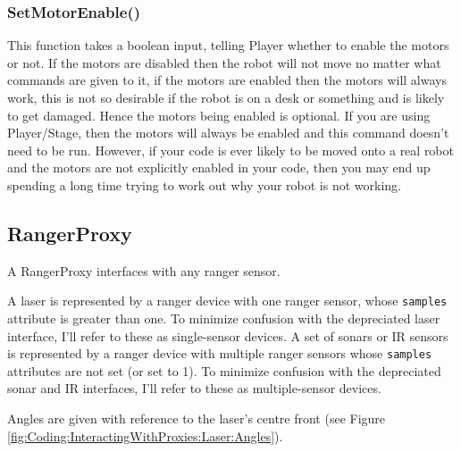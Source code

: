 \documentclass[a4paper]{report}
\newcommand{\plst}{Player/Stage\xspace}
\newcommand{\pl}{Player\xspace}
\begin{document}
\subsubsection{SetMotorEnable()}
This function takes a boolean input, telling \pl whether to enable the
motors or not. If the motors are disabled then the robot will not move no
matter what commands are given to it, if the motors are enabled then the
motors will always work, this is not so desirable if the robot is on a desk
or something and is likely to get damaged. Hence the motors being enabled
is optional. If you are using \plst, then the motors will always be enabled
and this command doesn't need to be run. However, if your code is ever
likely to be moved onto a real robot and the motors are not explicitly
enabled in your code, then you may end up spending a long time trying to
work out why your robot is not working.

\subsection{RangerProxy}\label{sec:Coding:InteractingWithProxies:Ranger}
A RangerProxy interfaces with any ranger sensor.  

A laser is represented by a ranger device with one ranger sensor, whose
{\tt samples} attribute is greater than one.  To minimize confusion with
the depreciated laser interface, I'll refer to these as single-sensor
devices.  A set of sonars or IR sensors is represented by a ranger device
with multiple ranger sensors whose {\tt samples} attributes are not set (or
set to 1).  To minimize confusion with the depreciated sonar and IR
interfaces, I'll refer to these as multiple-sensor devices.


Angles are given with reference to the laser's centre front (see Figure
\ref{fig:Coding:InteractingWithProxies:Laser:Angles}).
\end{document}
